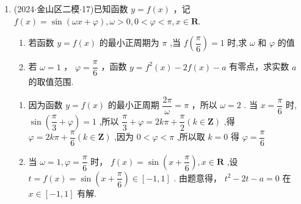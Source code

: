 \begin{enumerate}
    \item (2024$\cdot$金山区二模$\cdot$17)已知函数 $y = f\left( x\right)$ ，记 $f\left( x\right)  = \sin \left( {{\omega x} + \varphi }\right) ,\omega  > 0,0 < \varphi  < \pi ,x \in  \mathbf{R}$.
    \begin{enumerate}
        \item 若函数 $y = f\left( x\right)$ 的最小正周期为 $\pi$ ,当 $f\left( \dfrac{\pi }{6}\right)  = 1$ 时,求 $\omega$ 和 $\varphi$ 的值
        \item 若 $\omega  = 1$ ， $\varphi  = \dfrac{\pi }{6}$ ，函数 $y = {f}^{2}\left( x\right)  - {2f}\left( x\right)  - a$ 有零点，求实数 $a$ 的取值范围.
    \end{enumerate}
    \begin{jieda}
        \begin{enumerate}
            \item 因为函数 $y = f\left( x\right)$ 的最小正周期 $\dfrac{2\pi }{\omega } = \pi$ ，所以 $\omega  = 2$ . 当 $x = \dfrac{\pi }{6}$ 时, $\sin \left( {\dfrac{\pi }{3} + \varphi }\right)  = 1$ ,所以 $\dfrac{\pi }{3} + \varphi  = {2k\pi } + \dfrac{\pi }{2}\left( {k \in  \mathbf{Z}}\right)$ ,得 $\varphi  = {2k\pi } + \dfrac{\pi }{6}\left( {k \in  \mathbf{Z}}\right)$ ,因为 $0 < \varphi  < \pi$ ,所以取 $k = 0$ 得 $\varphi  = \dfrac{\pi }{6}$
            
            \item 当 $\omega  = 1,\varphi  = \dfrac{\pi }{6}$ 时， $f\left( x\right)  = \sin \left( {x + \dfrac{\pi }{6}}\right) ,x \in  \mathbf{R}$ ,设 $t =  f\left( x\right)  = \sin \left( {x + \dfrac{\pi }{6}}\right)  \in  \left\lbrack  {-1,1}\right\rbrack$ . 由题意得， ${t}^{2} - {2t} - a = 0$ 在 $x \in  \left\lbrack  {-1,1}\right\rbrack$ 有解.
        \end{enumerate}
    \end{jieda}


\end{enumerate}
